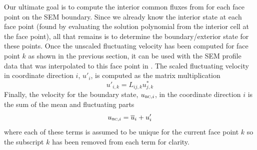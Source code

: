 
\label{SEC:SEM:theory:ComputeBC}

Our ultimate goal is to compute the interior common fluxes from
 for each face point on the SEM boundary.
%
Since we already know the interior state at each face point (found by evaluating
the solution polynomial from the interior cell at the face point), all that
remains is to determine the boundary\slash exterior state for these points.
%
Once the unscaled fluctuating velocity has been computed for face point $k$ as
shown in the previous section, it can be used with the SEM profile
data that was interpolated to this face point in
.
%
The scaled fluctuating velocity in coordinate direction $i$, $u'_i$, is computed
as the matrix multiplication
%
\begin{equation*}
  u'_{i,k} = L_{ij,k} u^*_{j,k}
\end{equation*}
%
Finally, the velocity for the boundary state, $u_{\textsc{bc},i}$, in the coordinate
direction $i$ is the sum of the mean and fluctuating parts
%
\begin{equation*}
  u_{\textsc{bc},i} = \overline{u}_{i} + u'_i
\end{equation*}
%
where each of these terms is assumed to be unique for the current face point $k$
so the subscript $k$ has been removed from each term for clarity.


